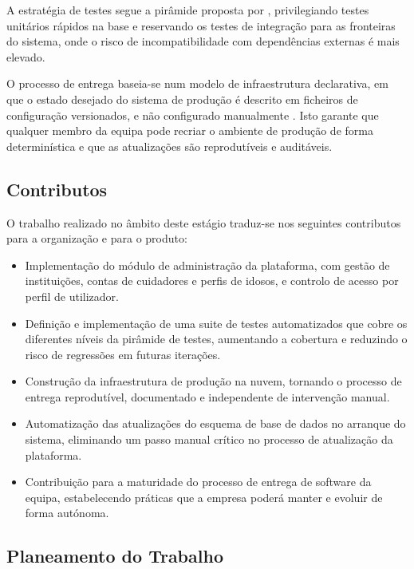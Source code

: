 A estratégia de testes segue a pirâmide proposta por \textcite{cohn2009succeeding},
privilegiando testes unitários rápidos na base e reservando os testes de integração para as
fronteiras do sistema, onde o risco de incompatibilidade com dependências externas é mais
elevado.

O processo de entrega baseia-se num modelo de infraestrutura declarativa, em que o estado
desejado do sistema de produção é descrito em ficheiros de configuração versionados, e não
configurado manualmente \parencite{humble2010continuous}. Isto garante que qualquer membro da
equipa pode recriar o ambiente de produção de forma determinística e que as atualizações são
reprodutíveis e auditáveis.

\subsection{Contributos}
\label{subsec:contributos}

O trabalho realizado no âmbito deste estágio traduz-se nos seguintes contributos para a
organização e para o produto:

\begin{itemize}
    \item Implementação do módulo de administração da plataforma, com gestão de instituições,
    contas de cuidadores e perfis de idosos, e controlo de acesso por perfil de utilizador.

    \item Definição e implementação de uma suite de testes automatizados que cobre os
    diferentes níveis da pirâmide de testes, aumentando a cobertura e reduzindo o risco de
    regressões em futuras iterações.

    \item Construção da infraestrutura de produção na nuvem, tornando o processo de entrega
    reprodutível, documentado e independente de intervenção manual.

    \item Automatização das atualizações do esquema de base de dados no arranque do sistema,
    eliminando um passo manual crítico no processo de atualização da plataforma.

    \item Contribuição para a maturidade do processo de entrega de software da equipa,
    estabelecendo práticas que a empresa poderá manter e evoluir de forma autónoma.
\end{itemize}

\subsection{Planeamento do Trabalho}
\label{subsec:planeamento}

